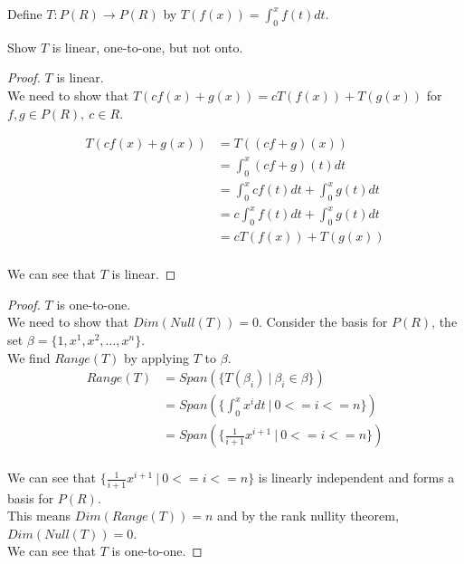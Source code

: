 \documentclass[12pt]{article}
\newenvironment{exercise}[2][Exercise]{\begin{trivlist}
\item[\hskip \labelsep{\bfseries #1}\hskip \labelsep{\bfseries #2.}]}{\end{trivlist}}
\begin{document}
\begin{exercise}{2.1.15} Define $T: P(R) \rightarrow P(R)$ by $T(f(x)) = \int_{0}^{x} f(t) dt$. 

    \noindent Show $T$ is linear, one-to-one, but not onto. \\

    \begin{proof} $T$ is linear. \\

        \noindent We need to show that $T(cf(x) + g(x)) = cT(f(x)) + T(g(x))$ for $f, g \in P(R),\ c \in R$.

        \begin{align*}
            T(cf(x) + g(x))
            & = T((cf + g)(x)) \\
            & = \int_{0}^{x} (cf + g)(t) dt \\
            & = \int_{0}^{x} cf(t) dt + \int_{0}^{x} g(t) dt \\
            & = c \int_{0}^{x} f(t) dt + \int_{0}^{x} g(t) dt \\
            & = cT(f(x)) + T(g(x)) \\
        \end{align*}

        \noindent We can see that $T$ is linear.

    \end{proof}

    \begin{proof} $T$ is one-to-one. \\

        \noindent We need to show that $Dim(Null(T)) = 0$.
        Consider the basis for $P(R)$, the set $\beta = \{1, x^1, x^2, \dots, x^n\}$. \\
        We find $Range(T)$ by applying $T$ to $\beta$. \\

        \begin{align*}
            Range(T)
            & = Span(\{T(\beta_i)\ |\ \beta_i \in \beta\}) \\
            & = Span(\{\int_{0}^{x} x^i dt\ |\ 0 <= i <= n\}) \\
            & = Span(\{\frac{1}{i+1} x^{i+1}\ |\ 0 <= i <= n\}) \\
        \end{align*}

        \noindent We can see that $\{\frac{1}{i+1} x^{i+1}\ |\ 0 <= i <= n\}$ is linearly independent and forms a basis for $P(R)$. \\
        This means $Dim(Range(T)) = n$ and by the rank nullity theorem, $Dim(Null(T)) = 0$. \\
        We can see that $T$ is one-to-one.


\end{proof}
\end{exercise}
\end{document}
